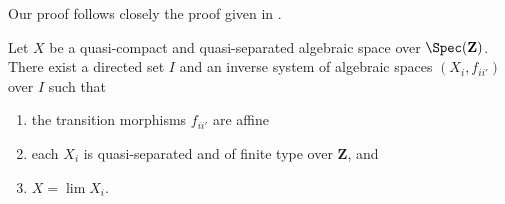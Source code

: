 \begin{proposition}
\label{proposition-approximate}
\begin{reference}
Our proof follows closely the proof given in \cite[Theorem 1.2.2]{CLO}.
\end{reference}
Let $X$ be a quasi-compact and quasi-separated algebraic space over
$\Spec(\mathbf{Z})$. There exist a directed set $I$
and an inverse system of algebraic spaces $(X_i, f_{ii'})$ over $I$
such that
\begin{enumerate}
\item the transition morphisms $f_{ii'}$ are affine
\item each $X_i$ is quasi-separated and of finite type over
$\mathbf{Z}$, and
\item $X = \lim X_i$.
\end{enumerate}
\end{proposition}

